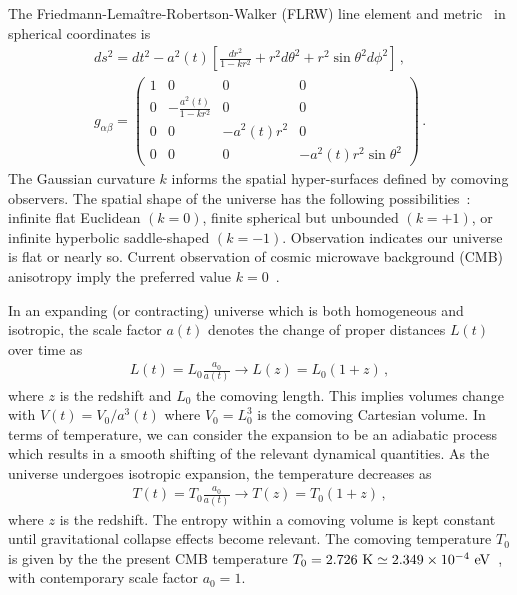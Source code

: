  The Friedmann-Lema{\^i}tre-Robertson-Walker (FLRW) line element and metric~\cite{Hobson:2006se,Hartle:2003yu,Misner:1973prb,Weinberg:1972kfs} in spherical coordinates is
\begin{gather}
 \label{FLRW} ds^2=dt^2-a^2(t)\left[\frac{dr^2}{1-kr^{2}}+r^{2}d\theta^2+r^{2}\sin\theta^{2}d\phi^2\right]\,,\\[0.3cm]
 g_{\alpha\beta}=
 \begin{pmatrix}
 1&0&0&0\\
 0&-\displaystyle\frac{a^{2}(t)}{1-kr^{2}}&0&0\\
 0&0&-a^{2}(t)r^{2}&0\\
 0&0&0&-a^{2}(t)r^{2}\sin\theta^{2}
 \end{pmatrix}\,.
\end{gather}
The Gaussian curvature $k$ informs the spatial hyper-surfaces defined by comoving observers. The spatial shape of the universe has the following possibilities~\cite{Planck:2018vyg}: infinite flat Euclidean $(k=0)$, finite spherical but unbounded $(k=+1)$, or infinite hyperbolic saddle-shaped $(k=-1)$. Observation indicates our universe is flat or nearly so. Current observation of cosmic microwave background (CMB) anisotropy imply the preferred value $k=0$~\cite{Planck:2018vyg,Planck:2015fie,Planck:2013pxb}.

In an expanding (or contracting) universe which is both homogeneous and isotropic, the scale factor $a(t)$ denotes the change of proper distances $L(t)$ over time as
\begin{gather}
 L(t)=L_{0}\frac{a_{0}}{a(t)}\rightarrow L(z)=L_{0}(1+z)\,,
\end{gather}
where $z$ is the redshift and $L_{0}$ the comoving length. This implies volumes change with $V(t)=V_{0}/a^{3}(t)$ where $V_{0}=L_{0}^{3}$ is the comoving Cartesian volume. In terms of temperature, we can consider the expansion to be an adiabatic process~\cite{Abdalla:2022yfr} which results in a smooth shifting of the relevant dynamical quantities. As the universe undergoes isotropic expansion, the temperature decreases as 
\begin{gather}
 \label{tscale}
 T(t)=T_{0}\frac{a_{0}}{a(t)}\rightarrow T(z)=T_{0}(1+z)\,,
\end{gather}
where $z$ is the redshift. The entropy within a comoving volume is kept constant until gravitational collapse effects become relevant. The comoving temperature $T_{0}$ is given by the the present CMB temperature $T_{0}=2.726{\rm\ K}\simeq 2.349\times10^{-4}\text{ eV}$~\cite{Planck:2018vyg}, with contemporary scale factor $a_{0}=1$.

